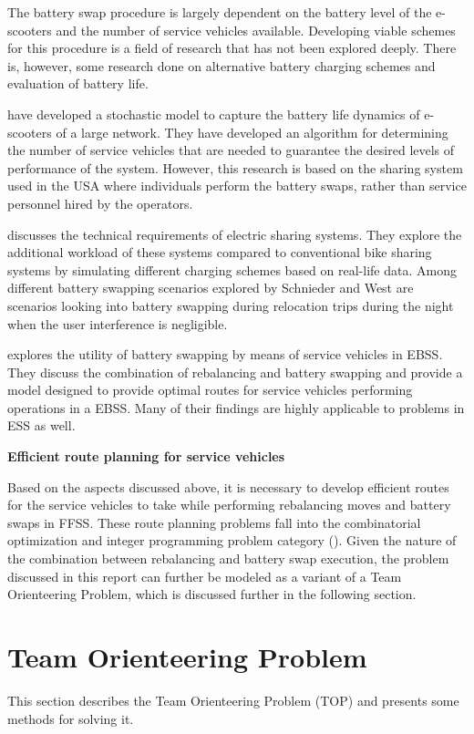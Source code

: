 The battery swap procedure is largely dependent on the battery level of the e-scooters and the number of service vehicles available. Developing viable schemes for this procedure is a field of research that has not been explored deeply. There is, however, some research done on alternative battery charging schemes and evaluation of battery life. 

\citet{pender_stochastic_2020} have developed a stochastic model to capture the battery life dynamics of e-scooters of a large network. They have developed an algorithm for determining the number of service vehicles that are needed to guarantee the desired levels of performance of the system. However, this research is based on the sharing system used in the USA where individuals perform the battery swaps, rather than service personnel hired by the operators.

\citet{schnieder_evaluation_2019} discusses the technical requirements of electric sharing systems. They explore the additional workload of these systems compared to conventional bike sharing systems by simulating different charging schemes based on real-life data. Among different battery swapping scenarios explored by Schnieder and West are scenarios looking into battery swapping during relocation trips during the night when the user interference is negligible.  

\citet{fosen_rebalancing_2020} explores the utility of battery swapping by means of service vehicles in EBSS. They discuss the combination of rebalancing and battery swapping and provide a model designed to provide optimal routes for service vehicles performing operations in a EBSS. Many of their findings are highly applicable to problems in ESS as well.  

\textbf{Efficient route planning for service vehicles}

Based on the aspects discussed above, it is necessary to develop efficient routes for the service vehicles to take while performing rebalancing moves and battery swaps in FFSS. These route planning problems fall into the combinatorial optimization and integer programming problem category (\cite{fosen_rebalancing_2020}). Given the nature of the combination between rebalancing and battery swap execution, the problem discussed in this report can further be modeled as a variant of a Team Orienteering Problem, which is discussed further in the following section. 


\section{Team Orienteering Problem}\label{TOP}
This section describes the Team Orienteering Problem (TOP) and presents some methods for solving it.

